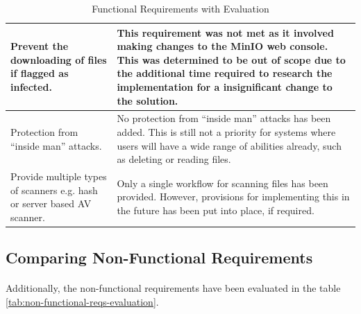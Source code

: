 \documentclass[12pt, conference, final, a4paper, onecolumn, compsoc]{IEEEtran}
\begin{document}
\begin{table}[H]
\begin{tabular}{|p{}|p{}|}
    Prevent the downloading of files if flagged as infected. & This requirement
                                                              was not met as it
                                                              involved making
                                                              changes to the
                                                              MinIO web console.
    This was determined to be out of scope due to the additional time required
                                                              to research the
                                                              implementation for
    a insignificant change to the solution. \\ \hline
    Protection from ``inside man'' attacks. & No protection from ``inside man''
                                              attacks has been added. This is
                                              still not a priority for systems
                                              where users will have a wide range
    of abilities already, such as deleting or reading files. \\ \hline
    Provide multiple types of scanners e.g. hash or server based AV scanner. &
                                                                               Only
                                                                               a
    single workflow for scanning files has been provided. However, provisions
                                                                               for
                                                                               implementing
    this in the future has been put into place, if required.  \\ \hline
  \end{tabular}
  \caption{Functional Requirements with Evaluation}
  \label{tab:functional-reqs-evaluation}
\end{table}

\subsection{Comparing Non-Functional Requirements}
\paragraph{}
Additionally, the non-functional requirements have been evaluated in the table
\ref{tab:non-functional-reqs-evaluation}.
\end{document}
